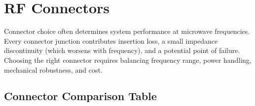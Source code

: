 \section{RF Connectors}\label{sec:wiki_connectors}



Connector choice often determines system performance at microwave frequencies. Every connector junction contributes insertion loss, a small impedance discontinuity (which worsens with frequency), and a potential point of failure. Choosing the right connector requires balancing frequency range, power handling, mechanical robustness, and cost.

      

\subsection{Connector Comparison Table}

      
        
        
        
        
        
        
        
        
        
        
        
        
      

